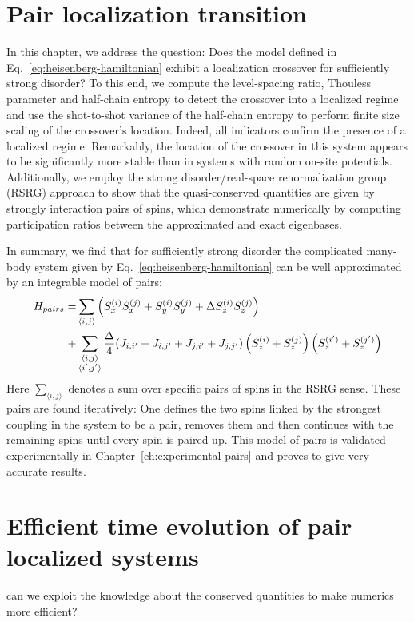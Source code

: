 \chapter{Pair localization transition}

In this chapter, we address the question: Does the model defined in Eq.~\ref{eq:heisenberg-hamiltonian} exhibit a localization crossover for sufficiently strong disorder? To this end, we compute the level-spacing ratio, Thouless parameter and half-chain entropy to detect the crossover into a localized regime and use the shot-to-shot variance of the half-chain entropy to perform finite size scaling of the crossover's location. Indeed, all indicators confirm the presence of a localized regime. Remarkably, the location of the crossover in this system appears to be significantly more stable than in systems with random on-site potentials. Additionally, we employ the strong disorder/real-space renormalization group (RSRG) approach to show that the quasi-conserved quantities are given by strongly interaction pairs of spins, which demonstrate numerically by computing participation ratios between the approximated and exact eigenbases.

In summary, we find that for sufficiently strong disorder the complicated many-body system given by Eq.~\ref{eq:heisenberg-hamiltonian} can be well approximated by an integrable model of pairs:
\begin{align}\label{eq:pair-model}
	H_{pairs} =& \sum_{\langle i,j\rangle} \left(S_x^{(i)}S_x^{(j)} + S_y^{(i)}S_y^{(j)} + \Delta S_z^{(i)}S_z^{(j)}\right) \notag\\
	+ &\sum_{\substack{\langle i,j\rangle\\\langle i',j'\rangle}} \frac{\Delta}{4}(J_{i,i'}+J_{i,j'}+J_{j,i'}+J_{j,j'})\left(S_z^{(i)}+S_z^{(j)}\right)\left(S_z^{(i')}+S_z^{(j')}\right)
\end{align}
Here $\sum_{\langle i,j\rangle}$ denotes a sum over specific pairs of spins in the RSRG sense. These pairs are found iteratively: One defines the two spins linked by the strongest coupling in the system to be a pair, removes them and then continues with the remaining spins until every spin is paired up. This model of pairs is validated experimentally in Chapter~\ref{ch:experimental-pairs} and proves to give very accurate results.



\chapter{Efficient time evolution of pair localized systems}



can we exploit the knowledge about the conserved quantities to make numerics more efficient?


